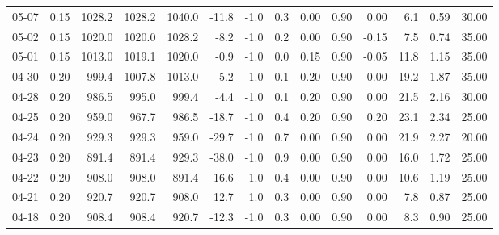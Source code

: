 \begin{threeparttable}
{\begin{tabular}{lrrrrrrrrrrrrr}
  05-07 &     0.15 & 1028.2 & 1028.2 & 1040.0 &      -11.8 &                     -1.0 &                 0.3 &       0.00 &      0.90 &           0.00 &              6.1 &            0.59 &                  30.00 \\
  05-02 &     0.15 & 1020.0 & 1020.0 & 1028.2 &       -8.2 &                     -1.0 &                 0.2 &       0.00 &      0.90 &          -0.15 &              7.5 &            0.74 &                  35.00 \\
  05-01 &     0.15 & 1013.0 & 1019.1 & 1020.0 &       -0.9 &                     -1.0 &                 0.0 &       0.15 &      0.90 &          -0.05 &             11.8 &            1.15 &                  35.00 \\
  04-30 &     0.20 &  999.4 & 1007.8 & 1013.0 &       -5.2 &                     -1.0 &                 0.1 &       0.20 &      0.90 &           0.00 &             19.2 &            1.87 &                  35.00 \\
  04-28 &     0.20 &  986.5 &  995.0 &  999.4 &       -4.4 &                     -1.0 &                 0.1 &       0.20 &      0.90 &           0.00 &             21.5 &            2.16 &                  30.00 \\
  04-25 &     0.20 &  959.0 &  967.7 &  986.5 &      -18.7 &                     -1.0 &                 0.4 &       0.20 &      0.90 &           0.20 &             23.1 &            2.34 &                  25.00 \\
  04-24 &     0.20 &  929.3 &  929.3 &  959.0 &      -29.7 &                     -1.0 &                 0.7 &       0.00 &      0.90 &           0.00 &             21.9 &            2.27 &                  20.00 \\
  04-23 &     0.20 &  891.4 &  891.4 &  929.3 &      -38.0 &                     -1.0 &                 0.9 &       0.00 &      0.90 &           0.00 &             16.0 &            1.72 &                  25.00 \\
  04-22 &     0.20 &  908.0 &  908.0 &  891.4 &       16.6 &                      1.0 &                 0.4 &       0.00 &      0.90 &           0.00 &             10.6 &            1.19 &                  25.00 \\
  04-21 &     0.20 &  920.7 &  920.7 &  908.0 &       12.7 &                      1.0 &                 0.3 &       0.00 &      0.90 &           0.00 &              7.8 &            0.87 &                  25.00 \\
  04-18 &     0.20 &  908.4 &  908.4 &  920.7 &      -12.3 &                     -1.0 &                 0.3 &       0.00 &      0.90 &           0.00 &              8.3 &            0.90 &                  25.00 \\

\end{tabular}}
\end{threeparttable}
